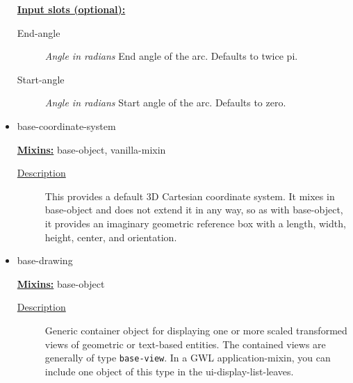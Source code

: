 \documentclass [11pt]{book}
\begin{document}
\begin{itemize}
\textbf{
\underline{Input slots (optional):}}

\begin{description}

\item [End-angle]
\emph{Angle in radians} End angle of the arc. Defaults to twice pi.


\item [Start-angle]
\emph{Angle in radians} Start angle of the arc. Defaults to zero.


\end{description}







\item {}base-coordinate-system


\textbf{
\underline{Mixins:}} base-object, vanilla-mixin





\begin{description}

\item [
\underline{Description}]


This provides a default 3D Cartesian
   coordinate system. It mixes in base-object and does not extend it
   in any way, so as with base-object, it provides an imaginary
   geometric reference box with a length, width, height, center, and
   orientation.



\end{description}









\item {}base-drawing


\textbf{
\underline{Mixins:}} base-object





\begin{description}

\item [
\underline{Description}]


Generic container object for displaying one or more scaled
transformed views of geometric or text-based entities. The contained views are generally 
of type \texttt{base-view}. In a GWL application-mixin, you can include one 
object of this type in the ui-display-list-leaves.


\end{description}
\end{itemize}
\end{document}
